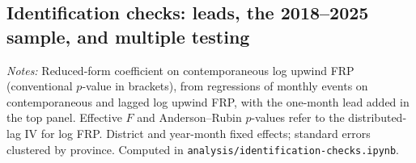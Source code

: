\documentclass[12pt]{article}
\begin{document}
\subsection{Identification checks: leads, the 2018--2025 sample, and multiple testing}
\label{sec:idchecks}

\begin{table}[H]
\centering
\caption{Lead placebo and 2018--2025 sample, reduced form for all events}
\label{tab:idchecks}
\begin{minipage}{0.95\textwidth}
\vspace{4pt}
\footnotesize \emph{Notes:} Reduced-form coefficient on contemporaneous log upwind FRP (conventional $p$-value in brackets), from regressions of monthly events on contemporaneous and lagged log upwind FRP, with the one-month lead added in the top panel. Effective $F$ and Anderson--Rubin $p$-values refer to the distributed-lag IV for log FRP. District and year-month fixed effects; standard errors clustered by province. Computed in \texttt{analysis/identification-checks.ipynb}.
\end{minipage}
\end{table}
\end{document}
